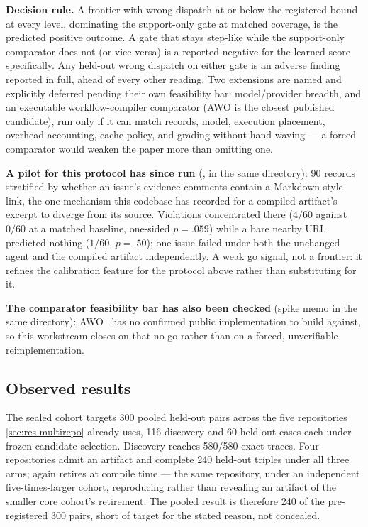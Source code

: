 \textbf{Decision rule.} A frontier with wrong-dispatch at or below the
registered bound at every level, dominating the support-only gate at matched
coverage, is the predicted positive outcome. A gate that stays step-like while
the support-only comparator does not (or vice versa) is a reported negative for
the learned score specifically. Any held-out wrong dispatch on either gate is
an adverse finding reported in full, ahead of every other reading. Two
extensions are named and explicitly deferred pending their own feasibility
bar: model/provider breadth, and an executable workflow-compiler comparator
(AWO is the closest published candidate), run only if it can match records,
model, execution placement, overhead accounting, cache policy, and grading
without hand-waving --- a forced comparator would weaken the paper more than
omitting one.

\textbf{A pilot for this protocol has since run}
(, in the same directory): 90 records
stratified by whether an issue's evidence comments contain a Markdown-style
link, the one mechanism this codebase has recorded for a compiled artifact's
excerpt to diverge from its source. Violations concentrated there
($4/60$ against $0/60$ at a matched baseline, one-sided $p=.059$) while a bare
nearby URL predicted nothing ($1/60$, $p=.50$); one issue failed under both the
unchanged agent and the compiled artifact independently. A weak go signal, not
a frontier: it refines the calibration feature for the protocol above rather
than substituting for it.

\textbf{The comparator feasibility bar has also been checked} (spike memo in
the same directory): AWO~\citep{abuzakuk2026awo} has no confirmed public
implementation to build against, so this workstream closes on that no-go
rather than on a forced, unverifiable reimplementation.

\subsection{Observed results}

The sealed cohort targets 300 pooled held-out pairs across the five
repositories \cref{sec:res-multirepo} already uses, 116 discovery and 60
held-out cases each under frozen-candidate selection. Discovery reaches
580/580 exact traces. Four repositories admit an artifact and complete 240
held-out triples under all three arms;  again retires
at compile time --- the same repository, under an independent
five-times-larger cohort, reproducing rather than revealing an artifact of
the smaller core cohort's retirement. The pooled result is therefore 240 of
the pre-registered 300 pairs, short of target for the stated reason, not
concealed.

